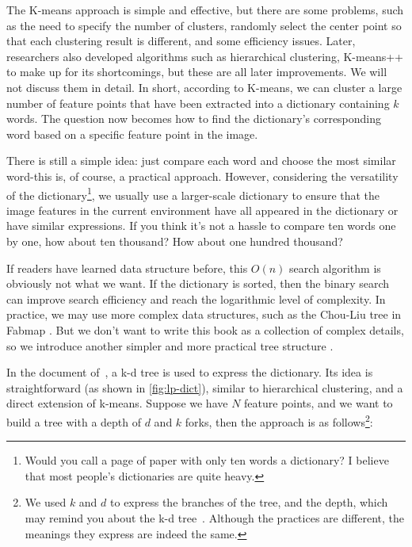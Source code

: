 The K-means approach is simple and effective, but there are some problems, such as the need to specify the number of clusters, randomly select the center point so that each clustering result is different, and some efficiency issues. Later, researchers also developed algorithms such as hierarchical clustering, K-means++{\cite{Arthur2007}} to make up for its shortcomings, but these are all later improvements. We will not discuss them in detail. In short, according to K-means, we can cluster a large number of feature points that have been extracted into a dictionary containing $k$ words. The question now becomes how to find the dictionary's corresponding word based on a specific feature point in the image.

There is still a simple idea: just compare each word and choose the most similar word-this is, of course, a practical approach. However, considering the versatility of the dictionary\footnote{Would you call a page of paper with only ten words a dictionary? I believe that most people's dictionaries are quite heavy. }, we usually use a larger-scale dictionary to ensure that the image features in the current environment have all appeared in the dictionary or have similar expressions. If you think it's not a hassle to compare ten words one by one, how about ten thousand? How about one hundred thousand?

If readers have learned data structure before, this $O(n)$ search algorithm is obviously not what we want. If the dictionary is sorted, then the binary search can improve search efficiency and reach the logarithmic level of complexity. In practice, we may use more complex data structures, such as the Chou-Liu tree {\cite{Chow1968}} in Fabmap {\cite{Cummins2008, Cummins2010, Cummins2011}}. But we don't want to write this book as a collection of complex details, so we introduce another simpler and more practical tree structure {\cite{Galvez-Lopez2012}}.

In the document of~\cite{Galvez-Lopez2012}, a k-d tree is used to express the dictionary. Its idea is straightforward (as shown in \autoref{fig:lp-dict}), similar to hierarchical clustering, and a direct extension of k-means. Suppose we have $N$ feature points, and we want to build a tree with a depth of $d$ and $k$ forks, then the approach is as follows\footnote{We used $k$ and $d$ to express the branches of the tree, and the depth, which may remind you about the k-d tree~\cite{Bentley1975}. Although the practices are different, the meanings they express are indeed the same. }:


